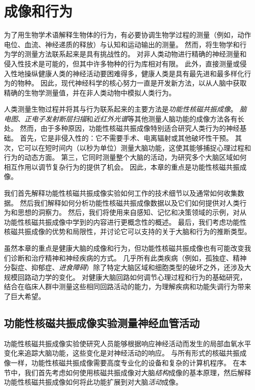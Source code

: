 \chapter{成像和行为} \label{chap:chap6}

为了用生物学术语解释生物体的行为，有必要协调生物学过程的测量（例如，动作电位、血流、神经递质的释放）与认知和运动输出的测量。
然而，将生物学和行为学的测量方法联系起来是具有挑战性的。
对非人类动物进行精确的神经测量和侵入性技术是可能的，但其中许多物种的行为库相对有限。
此外，直接测量或侵入性地操纵健康人类的神经活动要困难得多，健康人类是具有最先进和最多样化行为的物种。
因此，现代神经科学的核心努力一直是开发新方法，以从人脑中获取精确的生物学测量值，并在非人类动物中模拟人类行为。


人类测量生物过程并将其与行为联系起来的主要方法是\textit{功能性核磁共振成像}。
\textit{脑电图}、\textit{正电子发射断层扫描}和\textit{近红外光谱}等其他测量人脑功能的成像方法各有长处。
然而，由于多种原因，功能性核磁共振成像特别适合研究人类行为的神经基础。
首先，它是非侵入性的：它不需要手术、电离辐射或其他破坏性干预。
其次，它可以在短时间内（以秒为单位）测量大脑功能，这使其能够捕捉心理过程和行为的动态方面。
第三，它同时测量整个大脑的活动，为研究多个大脑区域如何相互作用以调节复杂行为的提供了机会。
因此，本章的重点是功能性核磁共振成像。


我们首先解释功能性核磁共振成像实验如何工作的技术细节以及通常如何收集数据。 
然后我们解释如何分析功能性核磁共振成像数据以及它们如何提供对人类行为和思想的洞察力。 
然后，我们将使用来自感知、记忆和决策领域的示例，对从功能性核磁共振成像中学到的内容进行更概念性的概述。
最后，我们考虑功能性核磁共振成像的优势和局限性，并讨论它可以支持的关于大脑和行为的推断类型。


虽然本章的重点是健康大脑的成像和行为，但功能性核磁共振成像也有可能改变我们诊断和治疗精神和神经疾病的方式。
几乎所有此类疾病（例如，孤独症、精神分裂症、抑郁症、\textit{进食障碍}）除了特定大脑区域和细胞类型的破坏之外，还涉及大规模回路动力学的变化。
对健康大脑回路如何调节心理过程和行为的基础研究，结合在临床人群中测量这些相同回路活动的能力，为理解疾病和功能失调行为带来了巨大希望。



\section{功能性核磁共振成像实验测量神经血管活动}

功能性核磁共振成像实验使研究人员能够根据响应神经活动而发生的局部血氧水平变化来追踪大脑功能，这些变化是对神经活动的响应。
与所有形式的核磁共振成像一样，功能性核磁共振成像需要高度专业化的设备和复杂的计算机程序。
在本节中，我们首先考虑如何使用核磁共振成像对大脑\textit{结构}成像的基本原理，然后解释功能性核磁共振成像如何将此功能扩展到对大脑\textit{活动}成像。


